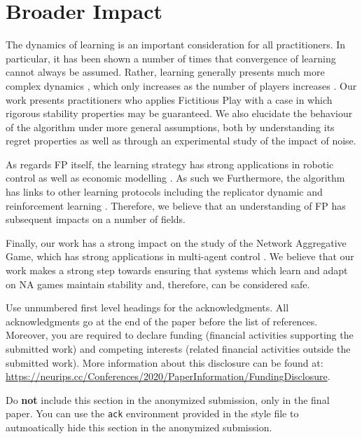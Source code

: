\documentclass{article}
\theoremstyle{definition}
\begin{document}
\section*{Broader Impact}

The dynamics of learning is an important consideration for all practitioners. In particular, it has
been shown a number of times \cite{Mertikopoulos2018} that convergence of learning cannot always be
assumed. Rather, learning generally presents much more complex dynamics \cite{Galla2013}, which
only increases as the number of players increases \cite{Sanders2018}. Our work presents practitioners
who applies Fictitious Play with a case in which rigorous stability properties may be guaranteed.
We also elucidate the behaviour of the algorithm under more general assumptions, both by
understanding its regret properties as well as through an experimental study of the impact of noise.

As regards FP  itself, the learning strategy has strong applications in robotic control
\cite{Smyrnakis2016, Hernandez2013, Sharma2015} as well as economic modelling \cite{vonNeumann1944}. As such we
Furthermore, the algorithm has links to other learning protocols including the replicator dynamic
\cite{Benaim2006} and reinforcement learning \cite{Leslie2006}. Therefore, we believe that an
understanding of FP has subsequent impacts on a number of fields.

Finally, our work has a strong impact on the study of the Network Aggregative Game, which has strong
applications in multi-agent control \cite{Bianchi2019, DePersis2020}. We 
believe that our work makes a strong step towards ensuring that systems which learn and adapt on
NA games maintain stability and, therefore, can be considered safe.

\begin{ack}
Use unnumbered first level headings for the acknowledgments. All acknowledgments
go at the end of the paper before the list of references. Moreover, you are required to declare 
funding (financial activities supporting the submitted work) and competing interests (related financial activities outside the submitted work). 
More information about this disclosure can be found at: \url{https://neurips.cc/Conferences/2020/PaperInformation/FundingDisclosure}.


Do {\bf not} include this section in the anonymized submission, only in the final paper. You can use the \texttt{ack} environment provided in the style file to autmoatically hide this section in the anonymized submission.
\end{ack} 



\end{document}
